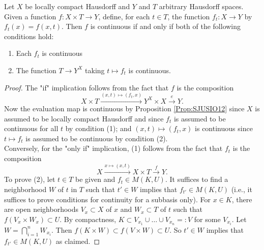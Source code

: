\begin{theorem}[]\label{Thm:Compact-Open-Top}
    Let $X$ be locally compact Hausdorff and $Y$ and
    $T$ arbitrary Hausdorff spaces. Given a function
    $f \colon X \times T \to Y$, define, for each
    $t \in T$, the function
    $f_t \colon X \to Y$ by
    $f_t (x) = f(x,t)$. Then $f$ is continuous
    if and only if both of the following conditions
    hold:
    \begin{enumerate}
        \item Each $f_t$ is continuous
        \item The function $T \to Y^{X}$ taking
            $t \mapsto f_t$ is continuous.
    \end{enumerate}
\end{theorem}

\begin{proof}
    The "if" implication follows from the fact
    that $f$ is the composition
    \[
    X \times T \stackrel{\left( x,t \right) \mapsto 
    \left( f_t, x \right) }{\longrightarrow} Y^{X} \times X
    \stackrel{e}{\to} Y.
    \] 
    Now the evaluation map is continuous
    by Proposition \ref{Prop:SJUSIO12} since
    $X$ is assumed to be locally compact Hausdorff and
    since $f_t$ is assumed to
    be continuous for all $t$ by condition (1); and
    $\left( x,t \right) \mapsto \left( f_t, x \right) $ 
    is continuous since 
    $t \mapsto f_t$ is assumed to be continuous
    by condition (2).\\
    Conversely, for the "only if" implication,
    (1) follows from the fact that $f_t$ is the
    composition
    \[
    X \stackrel{x \mapsto (x,t)}{\to} X \times T
    \stackrel{f}{\to} Y.
    \] 
    To prove (2), let
    $t \in T$ be given and
    $f_t \in M\left( K, U \right) $. It suffices
    to find a neighborhood $W$ of $t$ in $T$ such that
    $t' \in W$ implies that
    $f_{t'} \in M\left( K,U \right) $ (i.e., it suffices to
    prove conditions for continuity for a subbasis only).
    For $x \in K$, there are open neighborhoods $V_x \subset 
    X$ of $x$ and $W_x \subset T$ of $t$ such that
    $f\left( V_x \times W_x \right) \subset U$.
    By compactness, $K \subset 
    V_{x_1} \cup  \ldots \cup  V_{x_n} =: V$ for
    some $V_{x_i}$. Let
    $W = \bigcap_{i=1}^{n} W_{x_i}$. Then
    $f\left( K \times W \right) \subset 
    f\left( V \times W \right)  \subset U$.
    So $t' \in W$ implies that
    $f_{t'} \in M\left( K,U \right) $ as claimed.
\end{proof}

